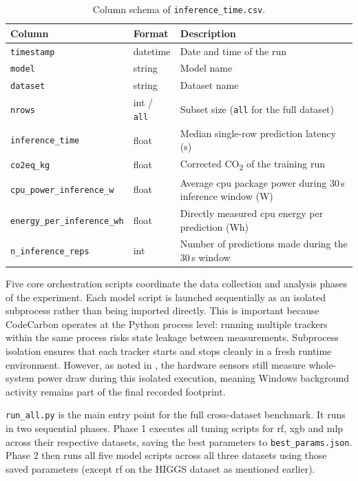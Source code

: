 \begin{table}[htbp]
\centering
\small
\caption{Column schema of \texttt{inference\_time.csv}.}
\label{tab:inference_schema}
\begin{tabularx}{\linewidth}{@{} l l X @{}}
\toprule
\textbf{Column} & \textbf{Format} & \textbf{Description} \\
\midrule
\texttt{timestamp}              & datetime           & Date and time of the run \\
\texttt{model}                  & string             & Model name \\
\texttt{dataset}                & string             & Dataset name \\
\texttt{nrows}                  & int / \texttt{all} & Subset size (\texttt{all} for the full dataset) \\
\texttt{inference\_time}           & float              & Median single-row prediction latency (s) \\
\texttt{co2eq\_kg}                 & float              & Corrected CO\textsubscript{2} of the training run \\
\texttt{cpu\_power\_inference\_w}  & float              & Average \gls{cpu} package power during 30\,s inference window (W) \\
\texttt{energy\_per\_inference\_wh} & float             & Directly measured \gls{cpu} energy per prediction (Wh) \\
\texttt{n\_inference\_reps}        & int                & Number of predictions made during the 30\,s window \\
\bottomrule
\end{tabularx}
\end{table}

Five core orchestration scripts coordinate the data collection and analysis phases of the experiment.
Each model script is launched sequentially as an isolated subprocess rather than being imported directly. This is important because CodeCarbon operates at the Python process level: running multiple trackers within the same process risks state leakage between measurements. Subprocess isolation ensures that each tracker starts and stops cleanly in a fresh runtime environment. However, as noted in , the hardware sensors still measure whole-system power draw during this isolated execution, meaning Windows background activity remains part of the final recorded footprint.

\texttt{run\_all.py} is the main entry point for the full cross-dataset benchmark. It runs in two sequential phases. Phase 1 executes all tuning scripts for \gls{rf}, \gls{xgb} and \gls{mlp} across their respective datasets, saving the best parameters to \texttt{best\_params.json}. Phase 2 then runs all five model scripts across all three datasets using those saved parameters (except \gls{rf} on the HIGGS dataset as mentioned earlier).

